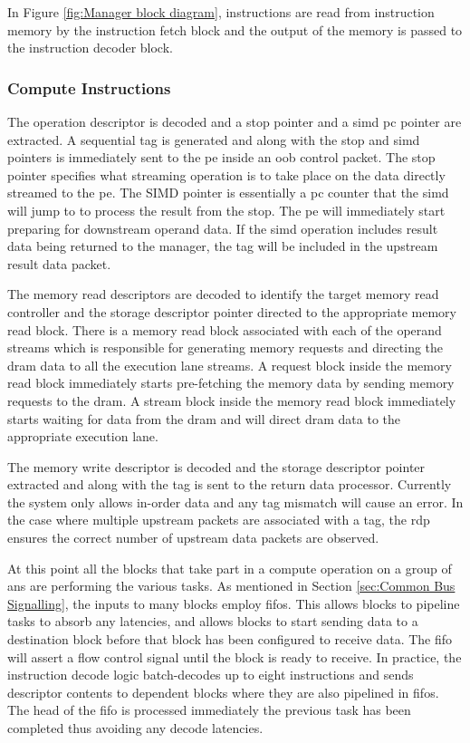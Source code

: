 In Figure \ref{fig:Manager block diagram}, instructions are read from instruction memory by the instruction fetch block and the output of the memory is passed to the instruction decoder block.

\subsubsection{Compute Instructions}
\label{sec:Decoding Compute Instructions}

The operation descriptor is decoded and a \ac{stop} pointer and a \ac{simd} \ac{pc} pointer are extracted. 
A sequential tag is generated and along with the \ac{stop} and \ac{simd} pointers is immediately sent to the \ac{pe} inside an \ac{oob} control packet.
The \ac{stop} pointer specifies what streaming operation is to take place on the data directly streamed to the \ac{pe}. 
The SIMD pointer is essentially a \ac{pc} counter that the \ac{simd} will jump to to process the result from the \ac{stop}.
The \ac{pe} will immediately start preparing for downstream operand data.
If the \ac{simd} operation includes result data being returned to the manager, the tag will be included in the upstream result data packet.

The memory read descriptors are decoded to identify the target memory read controller and the storage descriptor pointer directed to the appropriate memory read block.
There is a memory read block associated with each of the operand streams which is responsible for generating memory requests and directing the \ac{dram} data to all the execution lane streams.
A request block inside the memory read block immediately starts pre-fetching the memory data by sending memory requests to the \ac{dram}.
A stream block inside the memory read block immediately starts waiting for data from the \ac{dram} and will direct \ac{dram} data to the appropriate execution lane.

The memory write descriptor is decoded and the storage descriptor pointer extracted and along with the tag is sent to the return data processor.
Currently the system only allows in-order data and any tag mismatch will cause an error.
In the case where multiple upstream packets are associated with a tag, the \ac{rdp} ensures the correct number of upstream data packets are observed.

At this point all the blocks that take part in a compute operation on a group of \acp{an} are performing the various tasks.
As mentioned in Section \ref{sec:Common Bus Signalling}, the inputs to many blocks employ \acp{fifo}. 
This allows blocks to pipeline tasks to absorb any latencies, and allows blocks to start sending data to a destination block before that block has been configured to receive data.
The \ac{fifo} will assert a flow control signal until the block is ready to receive.
In practice, the instruction decode logic batch-decodes up to eight instructions and sends descriptor contents to dependent blocks where they are also pipelined in \acp{fifo}.
The head of the \ac{fifo} is processed immediately the previous task has been completed thus avoiding any decode latencies.

